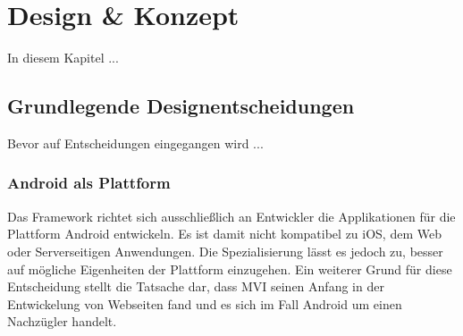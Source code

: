 \section{Design \& Konzept}
\label{sec:design-und-konzept}
In diesem Kapitel ...

\subsection{Grundlegende Designentscheidungen}
Bevor auf Entscheidungen eingegangen wird ...

\subsubsection{Android als Plattform}
Das Framework richtet sich ausschließlich an Entwickler die Applikationen für die Plattform Android entwickeln. Es ist damit nicht kompatibel zu iOS, dem Web oder Serverseitigen Anwendungen. Die Spezialisierung lässt es jedoch zu, besser auf mögliche Eigenheiten der Plattform einzugehen. Ein weiterer Grund für diese Entscheidung stellt die Tatsache dar, dass MVI seinen Anfang in der Entwickelung von Webseiten fand und es sich im Fall Android um einen Nachzügler handelt.

